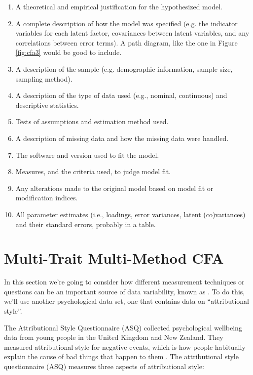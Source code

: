 \begin{enumerate} \itemsep -2pt
\item A theoretical and empirical justification for the hypothesized model.
\item A complete description of how the model was specified (e.g. the indicator variables for each latent factor, covariances between latent variables, and any correlations between error terms). A path diagram, like the one in Figure \ref{fig:cfa3} would be good to include.
\item A description of the sample (e.g. demographic information, sample size, sampling method).
\item A description of the type of data used (e.g., nominal, continuous) and descriptive statistics.
\item Tests of assumptions and estimation method used.
\item A description of missing data and how the missing data were handled.
\item The software and version used to fit the model.
\item Measures, and the criteria used, to judge model fit.
\item Any alterations made to the original model based on model fit or modification indices.
\item All parameter estimates (i.e., loadings, error variances, latent (co)variances) and their standard errors, probably in a table.
\end{enumerate}


\section{Multi-Trait Multi-Method CFA~\label{sec:MTMM}}

In this section we're going to consider how different measurement techniques or questions can be an important source of data variability, known as . To do this, we'll use another psychological data set, one that contains data on ``attributional style''. 

The Attributional Style Questionnaire (ASQ) \textcite{Hewitt2004} collected psychological wellbeing data from young people in the United Kingdom and New Zealand. They measured attributional style for negative events, which is how people habitually explain the cause of bad things that happen to them \parencite{Peterson1984}. The attributional style questionnaire (ASQ) measures three aspects of attributional style:

